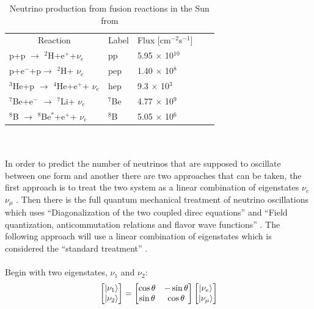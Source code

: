 \begin{table}
\centering
\begin{tabular}{lllll}  
\toprule
\multicolumn{1}{c}{Reaction} & \multicolumn{1}{c}{Label} & \multicolumn{1}{c}{Flux [cm$^{-2}$s$^{-1}$]}
\\
\cmidrule(r){1-1}
\cmidrule(r){2-2}
\cmidrule(r){3-3}
p+p $\rightarrow$ $^2$H+e$^+$+$\nu_e$           & pp                & 5.95 $\times$ 10$^{10}$\\
p+e$^-$+p$\rightarrow$ $^2$H+ $\nu_e$           & pep               & 1.40 $\times$ 10$^{8}$\\
$^3$He+p $\rightarrow$ $^4$He+e$^+$+ $\nu_e$     & hep               & 9.3  $\times$ 10$^{3}$\\
$^7$Be+e$^-$ $\rightarrow$ $^7$Li+ $\nu_e$       & $^7$Be            & 4.77 $\times$ 10$^{9}$\\
$^8$B $\rightarrow$ $^8$Be$^*$+e$^+$+ $\nu_e$   & $^8$B             & 5.05 $\times$ 10$^{6}$\\
\bottomrule   
\end{tabular}
\caption{Neutrino production from fusion reactions in the Sun from \cite{Bellerive:2003rj} }
\label{solar_nuetrino_table}
\end{table}
\\\\In order to predict the number of neutrinos that are supposed to oscillate between one form and another there are two approaches that can be taken, the first approach is to treat the two system as a linear combination of eigenstates $\nu_e$ $\nu_\mu$ \cite{griffiths2008book}\cite{griffiths2008neutrinoOscillations} \cite{sassaroli1999neutrino}. Then there is the full quantum mechanical treatment of neutrino oscillations which uses ``Diagonalization of the two coupled direc equations'' and ``Field quantization, anticommutation relations and flavor wave functions'' \cite{sassaroli1999neutrino}. The following approach will use a linear combination of eigenstates which is considered the ``standard treatment'' \cite{sassaroli1999neutrino} \cite{griffiths2008book} \cite{griffiths2008neutrinoOscillations}.
\\\\Begin with two eigenstates, $\nu_1$ and $\nu_2$: 
\begin{equation}
    \begin{bmatrix}
        \ket{\nu_1} \\
        \ket{\nu_2}
    \end{bmatrix}
    =
    \begin{bmatrix}
        \cos\theta & -\sin\theta \\
        \sin\theta & \cos\theta 
    \end{bmatrix}
        \begin{bmatrix}
        \ket{\nu_e} \\
        \ket{\nu_\mu}
    \end{bmatrix}
    \label{linear_combination_eq_1}
\end{equation}
